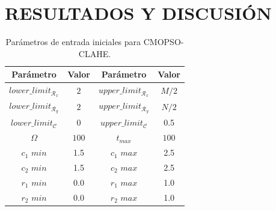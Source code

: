 \chapter{RESULTADOS Y DISCUSIÓN}
\label{sec:results_discussion}
\begin{table}[H]
\setlength{\abovecaptionskip}{2pt plus 3pt minus 2pt} %
\caption[Parámetros de entrada para $MOPSO$]{Parámetros de entrada iniciales para CMOPSO-CLAHE.}
\begin{center}
 \begin{tabular}{||c c | c c||} 
 \hline
 Parámetro & Valor & Parámetro & Valor \\ [0.5ex] 
 \hline\hline
 $lower\_limit_{\mathscr{R}_x}$ & $2$ & $upper\_limit_{\mathscr{R}_x}$ & $M/2$ \\ 
 \hline
 $lower\_limit_{\mathscr{R}_y}$ & $2$ & $upper\_limit_{\mathscr{R}_y}$ & $N/2$ \\  
 \hline
 $lower\_limit_{{\mathscr{C}}}$ & $0$ & $upper\_limit_{{\mathscr{C}}}$ & 0.5 \\
\hline
$\Omega$ & $100$ & $t_{max}$ & $100$ \\ 
\hline
$c_1$ $min$ & 1.5 & $c_1$ $max$ & 2.5 \\ 
\hline
$c_2$ $min$ & 1.5 & $c_2$ $max$ & 2.5 \\ 
\hline
$r_1$ $min$ & 0.0 & $r_1$ $max$ & 1.0 \\ 
\hline
$r_2$ $min$ & 0.0 & $r_2$ $max$ & 1.0 \\
\hline
\end{tabular}
\end{center}
\label{table:parametrospso}
\end{table}

